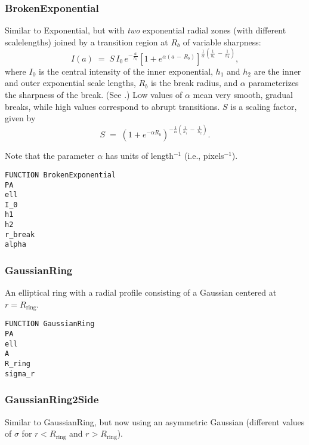\documentclass[10pt,a4paper,article]{memoir}
\begin{document}
\subsubsection{BrokenExponential}\label{sec:brokenexp}

Similar to Exponential, but with \textit{two}
exponential radial zones (with different scalelengths) joined by a transition region
at $R_{b}$ of variable sharpness:
\begin{equation}
	I(a) \; = \; S \, I_{0} \, e^{-\frac{a}{h_{1}}} [1 + e^{\alpha(a \, - \,
	R_{b})}]^{\frac{1}{\alpha} (\frac{1}{h_{1}} \, - \, \frac{1}{h_{2}})},
\end{equation}
where $I_{0}$ is the central intensity of the inner exponential, $h_{1}$ and
$h_{2}$ are the inner and outer exponential scale lengths, $R_{b}$ is the break radius, and
$\alpha$ parameterizes the sharpness of the break.  (See \citet{erwin08}.) Low values of $\alpha$
mean very smooth, gradual breaks, while high values correspond to abrupt
transitions.  $S$ is a scaling factor, given by
\begin{equation}
  S \; = \; (1 + e^{-\alpha R_{b}})^{-\frac{1}{\alpha} (\frac{1}{h_{1}} \, - 
  \, \frac{1}{h_{2}})}.
\end{equation}

Note that the parameter $\alpha$ has units of length$^{-1}$ (i.e., pixels$^{-1}$).

\begin{verbatim}
FUNCTION BrokenExponential
PA
ell
I_0
h1
h2
r_break
alpha
\end{verbatim}


\subsubsection{GaussianRing}

An elliptical ring with a radial profile consisting of a Gaussian
centered at $r = R_{\mathrm{ring}}$.

\begin{verbatim}
FUNCTION GaussianRing
PA
ell
A
R_ring
sigma_r
\end{verbatim}


\subsubsection{GaussianRing2Side}

Similar to GaussianRing, but now using an asymmetric Gaussian (different
values of $\sigma$ for $r < R_{\mathrm{ring}}$ and $r > R_{\mathrm{ring}}$).
\end{document}
